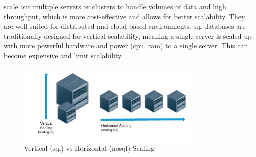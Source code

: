 \begin{multicols}{2}
\begin{itemize}
                  scale out multiple servers or clusters to handle volumes of data and high throughput, which is more cost-effective and
                  allows for better scalability. They are well-suited for distributed and cloud-based environments. \acrshort{sql}
                  databases are traditionally designed for vertical scalability, meaning a single server is scaled up with more powerful
                  hardware and power (\acrshort{cpu}, \acrshort{ram}) to a single server. This can become expensive and limit scalability.
      \end{itemize}
\end{multicols}

\begin{figure}[htbp]
      \centering
      \includegraphics[width=0.8\textwidth]{Figures/nosql-scalling.png}
      \caption{Vertical (\acrshort{sql}) \acrshort{vs} Horizontal (\acrshort{nosql}) Scaling}
      \label{fig:graphqlvsrestarchitecture}
\end{figure}

